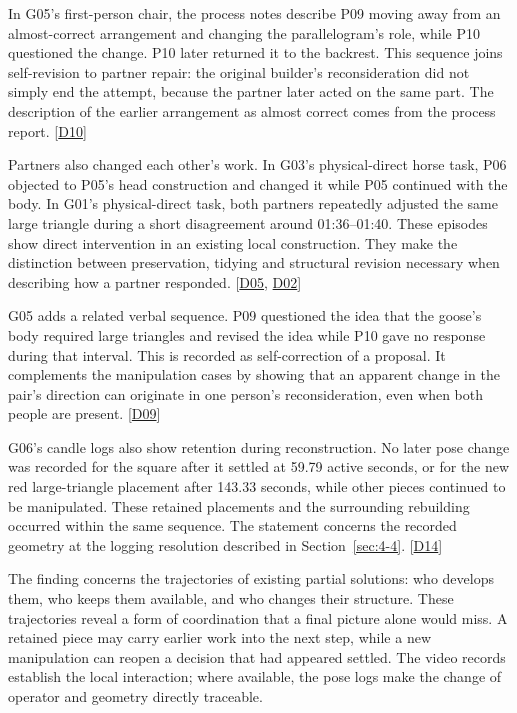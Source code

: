 In G05's first-person chair, the process notes describe P09 moving away from an almost-correct arrangement and changing the parallelogram's role, while P10 questioned the change. P10 later returned it to the backrest. This sequence joins self-revision to partner repair: the original builder's reconsideration did not simply end the attempt, because the partner later acted on the same part. The description of the earlier arrangement as almost correct comes from the process report. [\hyperlink{src:D10}{D10}]

Partners also changed each other's work. In G03's physical-direct horse task, P06 objected to P05's head construction and changed it while P05 continued with the body. In G01's physical-direct task, both partners repeatedly adjusted the same large triangle during a short disagreement around 01:36--01:40. These episodes show direct intervention in an existing local construction. They make the distinction between preservation, tidying and structural revision necessary when describing how a partner responded. [\hyperlink{src:D05}{D05}, \hyperlink{src:D02}{D02}]

G05 adds a related verbal sequence. P09 questioned the idea that the goose's body required large triangles and revised the idea while P10 gave no response during that interval. This is recorded as self-correction of a proposal. It complements the manipulation cases by showing that an apparent change in the pair's direction can originate in one person's reconsideration, even when both people are present. [\hyperlink{src:D09}{D09}]

G06's candle logs also show retention during reconstruction. No later pose change was recorded for the square after it settled at 59.79 active seconds, or for the new red large-triangle placement after 143.33 seconds, while other pieces continued to be manipulated. These retained placements and the surrounding rebuilding occurred within the same sequence. The statement concerns the recorded geometry at the logging resolution described in Section~\ref{sec:4-4}. [\hyperlink{src:D14}{D14}]

The finding concerns the trajectories of existing partial solutions: who develops them, who keeps them available, and who changes their structure. These trajectories reveal a form of coordination that a final picture alone would miss. A retained piece may carry earlier work into the next step, while a new manipulation can reopen a decision that had appeared settled. The video records establish the local interaction; where available, the pose logs make the change of operator and geometry directly traceable.


